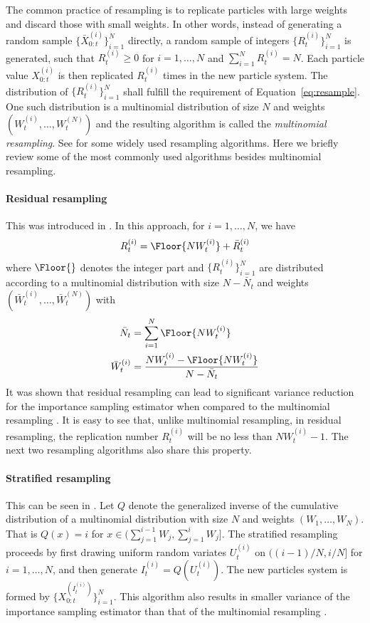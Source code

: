 The common practice of resampling is to replicate particles with large weights
and discard those with small weights. In other words, instead of generating a
random sample $\{\bar{X}_{0:t}^{(i)}\}_{i=1}^N$ directly, a random sample of
integers $\{R_t^{(i)}\}_{i=1}^N$ is generated, such that $R_t^{(i)} \ge 0$ for
$i = 1,\dots,N$ and $\sum_{i=1}^N R_t^{(i)} = N$. Each particle value
$X_{0:t}^{(i)}$ is then replicated $R_t^{(i)}$ times in the new particle
system. The distribution of $\{R_t^{(i)}\}_{i=1}^N$ shall fulfill the
requirement of Equation~\eqref{eq:resample}. One such distribution is a
multinomial distribution of size $N$ and weights
$(W_t^{(i)},\dots,W_t^{(N)})$ and the resulting algorithm is called the
\emph{multinomial resampling}. See \cite{Douc:2005wa} for some widely used
resampling algorithms. Here we briefly review some of the most commonly used
algorithms besides multinomial resampling.

\paragraph{Residual resampling} This was introduced in \cite{Liu:1998iu}. In
this approach, for $i = 1,\dots,N$, we have
\begin{equation}
  R_t^{(i)} = \Floor{NW_t^{(i)}} + \bar{R}_t^{(i)}
\end{equation}
where $\Floor{}$ denotes the integer part and $\{R_t^{(i)}\}_{i=1}^N$ are
distributed according to a multinomial distribution with size $N - \bar{N}_t$
and weights $(\bar{W}_t^{(i)},\dots,\bar{W}_t^{(N)})$ with
\begin{align*}
  \bar{N}_t &= \sum_{i=1}^N\Floor{NW_t^{(i)}} \\
  \bar{W}_t^{(i)} &= \frac{NW_t^{(i)} - \Floor{NW_t^{(i)}}}{N - \bar{N}_t}
\end{align*}
It was shown that residual resampling can lead to significant variance
reduction for the importance sampling estimator when compared to the
multinomial resampling \cite{Douc:2005wa}. It is easy to see that, unlike
multinomial resampling, in residual resampling, the replication number
$R_t^{(i)}$ will be no less than $NW_t^{(i)} - 1$. The next two resampling
algorithms also share this property.

\paragraph{Stratified resampling} This can be seen in \cite{Kitagawa:1996vx}.
Let $Q$ denote the generalized inverse of the cumulative distribution of a
multinomial distribution with size $N$ and weights $(W_1,\dots,W_N)$. That is
$Q(x) = i$ for $x\in(\sum_{j=1}^{i-1}W_j,\sum_{j=1}^iW_j]$. The stratified
resampling proceeds by first drawing uniform random variates $U_t^{(i)}$ on
$((i-1)/N, i/N]$ for $i = 1,\dots,N$, and then generate $I_t^{(i)} =
Q(U_t^{(i)})$. The new particles system is formed by
$\{X_{0:t}^{(I_t^{(i)})}\}_{i=1}^N$. This algorithm also results in smaller
variance of the importance sampling estimator than that of the multinomial
resampling \cite{Douc:2005wa}.

